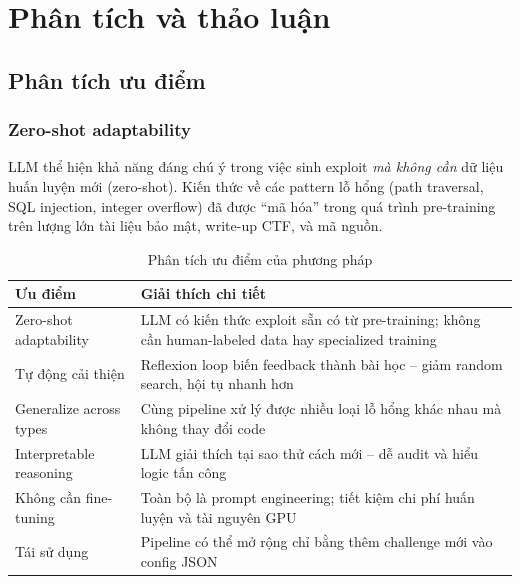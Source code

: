 \documentclass{nt521report}
\begin{document}
\chapter{Phân tích và thảo luận}
\label{chap:analysis}

\section{Phân tích ưu điểm}
\label{sec:advantages}

\subsection{Zero-shot adaptability}

LLM thể hiện khả năng đáng chú ý trong việc sinh exploit \textit{mà không cần} dữ liệu huấn luyện mới (zero-shot). Kiến thức về các pattern lỗ hổng (path traversal, SQL injection, integer overflow) đã được ``mã hóa'' trong quá trình pre-training trên lượng lớn tài liệu bảo mật, write-up CTF, và mã nguồn.

\begin{table}[H]
  \centering
  \caption{Phân tích ưu điểm của phương pháp}
  \label{tab:advantages}
  \begin{tabularx}{\textwidth}{l X}
    \toprule
    \textbf{Ưu điểm} & \textbf{Giải thích chi tiết} \\
    \midrule
    Zero-shot adaptability & LLM có kiến thức exploit sẵn có từ pre-training; không cần human-labeled data hay specialized training \\
    Tự động cải thiện & Reflexion loop biến feedback thành bài học -- giảm random search, hội tụ nhanh hơn \\
    Generalize across types & Cùng pipeline xử lý được nhiều loại lỗ hổng khác nhau mà không thay đổi code \\
    Interpretable reasoning & LLM giải thích tại sao thử cách mới -- dễ audit và hiểu logic tấn công \\
    Không cần fine-tuning & Toàn bộ là prompt engineering; tiết kiệm chi phí huấn luyện và tài nguyên GPU \\
    Tái sử dụng & Pipeline có thể mở rộng chỉ bằng thêm challenge mới vào config JSON \\
    \bottomrule
  \end{tabularx}
\end{table}
\end{document}
